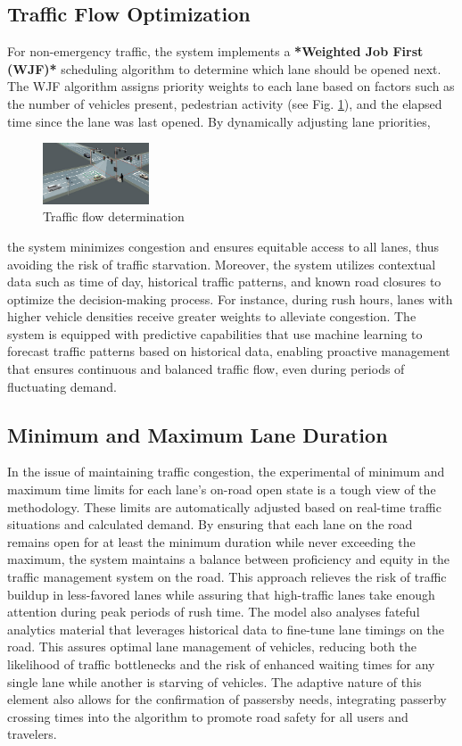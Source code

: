 \documentclass[usenatbib]{tjaa}
\begin{document}
\subsection{Traffic Flow Optimization}
For non-emergency traffic, the system implements a 
\textbf{*Weighted Job First (WJF)*} scheduling algorithm to determine which lane should be opened next. The WJF algorithm assigns priority weights to each lane based on factors such as the number of vehicles present, pedestrian activity (see Fig. \ref{fig:f3}), and the elapsed time since the lane was last opened. By dynamically adjusting lane priorities,
\begin{figure}
    \centering
    \includegraphics[width=0.28\textwidth]{2_.jpg}
    \caption{Traffic flow determination} %
    \label{fig:f3} %
\end{figure}
the system minimizes congestion and ensures equitable access to all lanes, thus avoiding the risk of traffic starvation. Moreover, the system utilizes contextual data such as time of day, historical traffic patterns, and known road closures to optimize the decision-making process. For instance, during rush hours, lanes with higher vehicle densities receive greater weights to alleviate congestion. The system is equipped with predictive capabilities that use machine learning to forecast traffic patterns based on historical data, enabling proactive management that ensures continuous and balanced traffic flow, even during periods of fluctuating demand.

\subsection{Minimum and Maximum Lane Duration}
In the issue of maintaining traffic congestion, the experimental of minimum and maximum time limits for each lane's on-road open state is a tough view of the methodology. These limits are automatically adjusted based on real-time traffic situations and calculated demand. By ensuring that each lane on the road remains open for at least the minimum duration while never exceeding the maximum, the system maintains a balance between proficiency and equity in the traffic management system on the road. This approach relieves the risk of traffic buildup in less-favored lanes while assuring that high-traffic lanes take enough attention during peak periods of rush time. The model also analyses fateful analytics material that leverages historical data to fine-tune lane timings on the road. This assures optimal lane management of vehicles, reducing both the likelihood of traffic bottlenecks and the risk of enhanced waiting times for any single lane while another is starving of vehicles. The adaptive nature of this element also allows for the confirmation of passersby needs, integrating passerby crossing times into the algorithm to promote road safety for all users and travelers.
\end{document}
